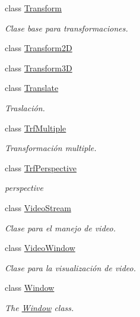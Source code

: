 \begin{DoxyCompactItemize}
class \hyperlink{class_i3_d_1_1_transform}{Transform}
\begin{DoxyCompactList}\small\item\em Clase base para transformaciones. \end{DoxyCompactList}\item 
class \hyperlink{class_i3_d_1_1_transform2_d}{Transform2D}
\item 
class \hyperlink{class_i3_d_1_1_transform3_d}{Transform3D}
\item 
class \hyperlink{class_i3_d_1_1_translate}{Translate}
\begin{DoxyCompactList}\small\item\em Traslación. \end{DoxyCompactList}\item 
class \hyperlink{class_i3_d_1_1_trf_multiple}{Trf\+Multiple}
\begin{DoxyCompactList}\small\item\em Transformación multiple. \end{DoxyCompactList}\item 
class \hyperlink{class_i3_d_1_1_trf_perspective}{Trf\+Perspective}
\begin{DoxyCompactList}\small\item\em perspective \end{DoxyCompactList}\item 
class \hyperlink{class_i3_d_1_1_video_stream}{Video\+Stream}
\begin{DoxyCompactList}\small\item\em Clase para el manejo de video. \end{DoxyCompactList}\item 
class \hyperlink{class_i3_d_1_1_video_window}{Video\+Window}
\begin{DoxyCompactList}\small\item\em Clase para la visualización de video. \end{DoxyCompactList}\item 
class \hyperlink{class_i3_d_1_1_window}{Window}
\begin{DoxyCompactList}\small\item\em The \hyperlink{class_i3_d_1_1_window}{Window} class. \end{DoxyCompactList}\end{DoxyCompactItemize}
